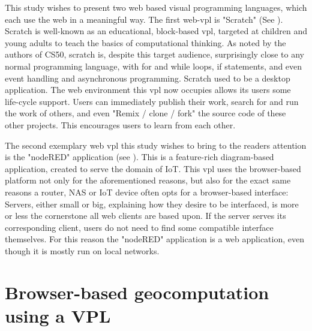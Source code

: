 This study wishes to present two web based visual programming languages, which each use the web in a meaningful way.  
The first web-vpl is "Scratch" \citep{resnick_scratch_2009} (See ). 
Scratch is well-known as an educational, block-based vpl, targeted at children and young adults to teach the basics of computational thinking.   
As noted by the authors of CS50, scratch is, despite this target audience, surprisingly close to any normal programming language, with for and while loops, if statements, and even event handling and asynchronous programming. 
Scratch used to be a desktop application. 
The web environment this vpl now occupies allows its users some life-cycle support. 
Users can immediately publish their work, search for and run the work of others, and even "Remix / clone / fork" the source code of these other projects. 
This encourages users to learn from each other.


The second exemplary web vpl this study wishes to bring to the readers attention is the "nodeRED" application \citep{openjs_foundation_node-red_2022} (see ). 
This is a feature-rich diagram-based application, created to serve the domain of IoT.
This vpl uses the browser-based platform not only for the aforementioned  reasons, but also for the exact same reasons a router, NAS or IoT device often opts for a browser-based interface: 
Servers, either small or big, explaining how they desire to be interfaced, is more or less the cornerstone all web clients are based upon.  
If the server serves its corresponding client, users do not need to find some compatible interface themselves.
For this reason the "nodeRED" application is a web application, even though it is mostly run on local networks.   

\section{Browser-based geocomputation using a VPL} 

